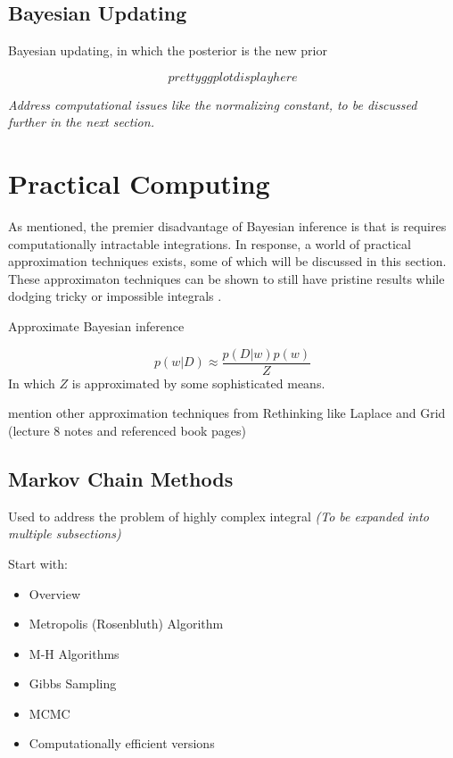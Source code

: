 \subsection{Bayesian Updating}

Bayesian updating, in which the posterior is the new prior

$$
pretty ggplot display here
$$

\textit{Address computational issues like the normalizing constant, to be discussed further in the next section.}

\section{Practical Computing}



 As mentioned, the premier disadvantage of Bayesian inference is that is requires computationally intractable integrations.  In response, a world of practical approximation techniques exists, some of which will be discussed in this section.  These approximaton techniques can be shown to still have pristine results while dodging tricky or impossible integrals \cite{tipping2004bayesian}.

 Approximate Bayesian inference

$$
p(w|D) \approx \frac{p(D|w)p(w)}{Z}
$$
In which $Z$ is approximated by some sophisticated means.

 mention other approximation techniques from Rethinking like Laplace and Grid (lecture 8 notes and referenced book pages)


\subsection{Markov Chain Methods}
Used to address the problem of highly complex integral
\textit{(To be expanded into multiple subsections)}

Start with:
\cite{mcelreath2016statistical} \cite{gelmanbayesian3}
\begin{itemize}
\tightlist
\item Overview
\item Metropolis (Rosenbluth) Algorithm
\item M-H Algorithms
\item Gibbs Sampling \cite{geman1984stochastic}
\item MCMC
\item Computationally efficient versions
\end{itemize}

